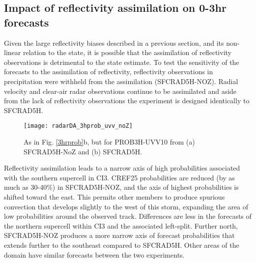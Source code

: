 \subsection{Impact of reflectivity assimilation on 0-3hr forecasts}
\label{section_zassim}
Given the large reflectivity biases described in a previous section, and its non-linear relation to the state, it is possible that the assimilation of reflectivity observations is detrimental to the state estimate. To test the sensitivity of the forecasts to the assimilation of reflectivity, reflectivity observations in precipitation were withheld from the assimilation (SFCRAD5H-NOZ). Radial velocity and clear-air radar observations continue to be assimilated and aside from the lack of reflectivity observations the experiment is designed identically to SFCRAD5H.

\begin{figure}
\centering
\texttt{[image: radarDA\_3hprob\_uvv\_noZ]}
\caption{As in Fig. \ref{3hrprob}b, but for PROB3H-UVV10 from (a) SFCRAD5H-NoZ and (b) SFCRAD5H.}
\label{probuvvnoZ}
\end{figure}

Reflectivity assimilation leads to a narrow axis of high probabilities associated with the southern supercell in CI3. CREF25 probabilities are reduced (by as much as 30-40\%) in SFCRAD5H-NOZ, and the axis of highest probabilities is shifted toward the east. This permits other members to produce spurious convection that develops slightly to the west of this storm, expanding the area of low probabilities around the observed track. Differences are less in the forecasts of the northern supercell within CI3 and the associated left-split. Further north, SFCRAD5H-NOZ produces a more narrow axis of forecast probabilities that extends further to the southeast compared to SFCRAD5H. Other areas of the domain have similar forecasts between the two experiments.

